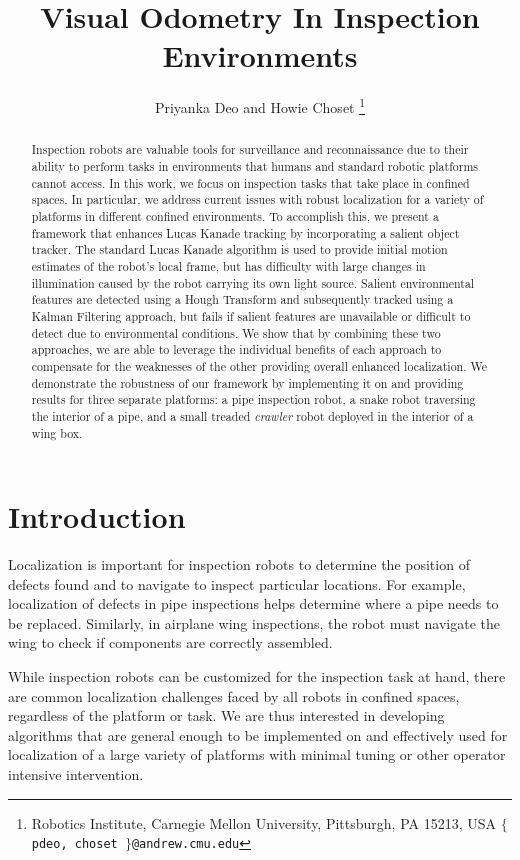 \documentclass[letterpaper, 10 pt, conference]{ieeeconf}
\title{\LARGE \bf Visual Odometry In Inspection Environments}
\author{Priyanka Deo and Howie Choset%
\thanks{Robotics Institute,
Carnegie Mellon University,
Pittsburgh, PA 15213, USA
{\tt\small $\lbrace$ pdeo, choset $\rbrace$@andrew.cmu.edu}}%
}
\begin{document}
\maketitle
\thispagestyle{empty}
\pagestyle{empty}


\begin{abstract}

Inspection robots are valuable tools for surveillance and reconnaissance due to their ability to perform tasks in environments that humans and standard robotic platforms cannot access. In this work, we focus on inspection tasks that take place in confined spaces. In particular, we address current issues with robust localization for a variety of platforms in different confined environments. To accomplish this, we present a framework that enhances Lucas Kanade tracking by incorporating a salient object tracker. The standard Lucas Kanade algorithm is used to provide initial motion estimates of the robot's local frame, but has difficulty with large changes in illumination caused by the robot carrying its own light source. Salient environmental features are detected using a Hough Transform and subsequently tracked using a Kalman Filtering approach, but fails if salient features are unavailable or difficult to detect due to environmental conditions. We show that by combining these two approaches, we are able to leverage the individual benefits of each approach to compensate for the weaknesses of the other providing overall enhanced localization. We demonstrate the robustness of our framework by implementing it on and providing results for three separate platforms: a pipe inspection robot, a snake robot traversing the interior of a pipe, and a small treaded \emph{crawler} robot deployed in the interior of a wing box.

\end{abstract}


\section{Introduction}

Localization is important for inspection robots to determine the position of defects found and to navigate to inspect particular locations. For example, localization of defects in pipe inspections helps determine where a pipe needs to be replaced. Similarly, in airplane wing inspections, the robot must navigate the wing to check if components are correctly assembled. 

While inspection robots can be customized for the inspection task at hand, there are common localization challenges faced by all robots in confined spaces, regardless of the platform or task. We are thus interested in developing algorithms that are general enough to be implemented on and effectively used for localization of a large variety of platforms with minimal tuning or other operator intensive intervention.
\end{document}
